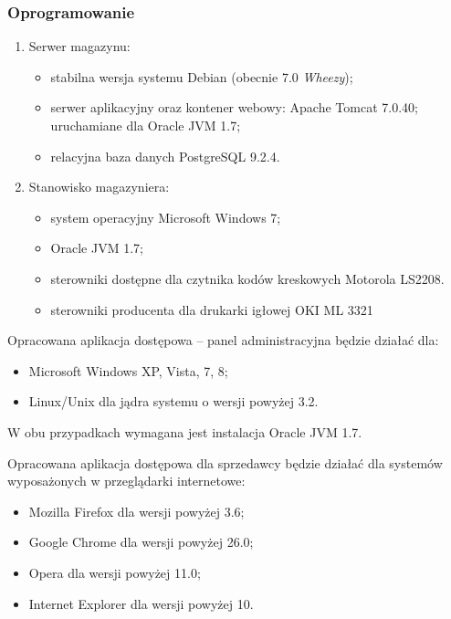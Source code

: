 \subsubsection{Oprogramowanie}

\begin{enumerate}
\item Serwer magazynu:
  \begin{itemize}
  \item stabilna wersja systemu Debian (obecnie 7.0 \emph{Wheezy});
  \item serwer aplikacyjny oraz kontener webowy: Apache Tomcat 7.0.40; uruchamiane dla Oracle JVM 1.7;
  \item relacyjna baza danych PostgreSQL 9.2.4.
  \end{itemize}
\item Stanowisko magazyniera:
  \begin{itemize}
  \item system operacyjny Microsoft Windows 7;
  \item Oracle JVM 1.7;
  \item sterowniki dostępne dla czytnika kodów kreskowych Motorola LS2208.
  \item sterowniki producenta dla drukarki igłowej OKI ML 3321
  \end{itemize}
\end{enumerate}

Opracowana aplikacja dostępowa -- panel administracyjna będzie działać dla:
\begin{itemize}
\item Microsoft Windows XP, Vista, 7, 8;
\item Linux/Unix dla jądra systemu o wersji powyżej 3.2.
\end{itemize}
W obu przypadkach wymagana jest instalacja Oracle JVM 1.7.

Opracowana aplikacja dostępowa dla sprzedawcy będzie działać dla systemów
wyposażonych w przeglądarki internetowe:
\begin{itemize}
\item Mozilla Firefox dla wersji powyżej 3.6;
\item Google Chrome dla wersji powyżej 26.0;
\item Opera dla wersji powyżej 11.0;
\item Internet Explorer dla wersji powyżej 10.
\end{itemize}



